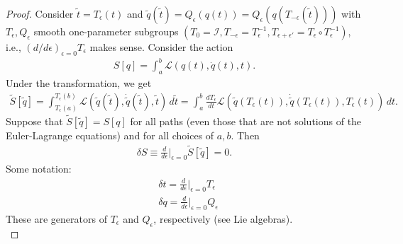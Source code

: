 \documentclass{book}
\theoremstyle{definition}
\newcommand{\lag}{\mathcal{L}}
\newcommand{\nn}{\nonumber}
\newcommand{\f}[2]{\frac{#1}{#2}}
\newcommand{\td}[1]{\tilde{#1}}
\newcommand{\Id}{\mathcal{I}}
\begin{document}
\begin{proof}
	Consider $\tilde{t} = T_\epsilon(t)$ and $\tilde{q}(\tilde{t}) = Q_\epsilon(q(t)) = Q_\epsilon (q(T_{-\epsilon} (\tilde{t})))$ with $T_\epsilon, Q_\epsilon$ smooth one-parameter subgroups $(T_0 = \Id, T_{-\epsilon} = T_\epsilon^{-1}, T_{\epsilon+ \epsilon'} = T_\epsilon \circ T^{-1}_\epsilon)$, i.e., $(d/d\epsilon)_{\epsilon=0} T_\epsilon$ makes sense. Consider the action
	\begin{align}
	S[q] = \int^b_a \lag(q(t), \dot{q}(t),t).
	\end{align}
	Under the transformation, we get
	\begin{align}
	\tilde{S}[\tilde{q}] = \int^{T_\epsilon(b)}_{T_\epsilon(a)} \lag(\td{q}(\td{t}), \dot{\td{q}}(\td{t}) , \td{t})\,d\td{t} = \int^b_a \f{dT_\epsilon}{dt}\lag(\td{q}(T_\epsilon(t)) , \dot{\td{q}}(T_\epsilon(t)), T_\epsilon(t) )\,dt.
	\end{align}
	Suppose that $\tilde{S}[\td{q}] = S[q]$ for all paths (even those that are not solutions of the Euler-Lagrange equations) and for all choices of $a,b$. Then 
	\begin{align}
	\delta S \equiv \f{d}{d\epsilon}\bigg\vert_{\epsilon = 0}\td{S}[\td{q}] = 0.
	\end{align}
	Some notation:
	\begin{align}
	&\delta t = \f{d}{d\epsilon}\bigg\vert_{\epsilon=0}T_\epsilon\nn\\
	&\delta q = \f{d}{d\epsilon}\bigg\vert_{\epsilon=0}Q_\epsilon
	\end{align}
	These are generators of $T_\epsilon$ and $Q_\epsilon$, respectively (see Lie algebras).\\
	

\end{proof}
\end{document}
